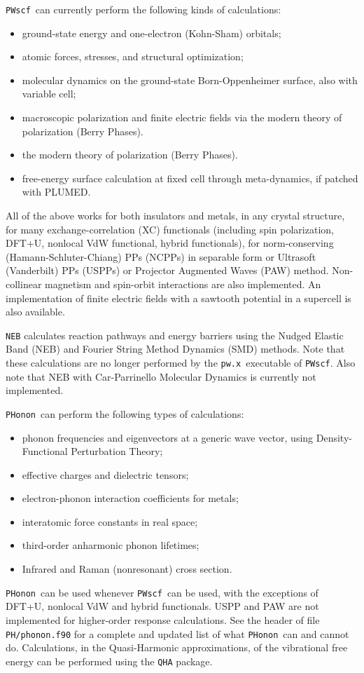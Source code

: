 \documentclass[12pt,a4paper]{article}
\def\pwx{\texttt{pw.x}}
\def\PWscf{\texttt{PWscf}}
\def\PHonon{\texttt{PHonon}}
\begin{document}
\PWscf\ can currently perform the following kinds of calculations:
\begin{itemize}
  \item ground-state energy and one-electron (Kohn-Sham) orbitals;
  \item atomic forces, stresses, and structural optimization;
  \item molecular dynamics on the ground-state Born-Oppenheimer surface,  also with variable cell;
  \item macroscopic polarization and finite electric fields via 
  the modern theory of polarization (Berry Phases).
  \item the modern theory of polarization (Berry Phases).
  \item free-energy surface calculation at fixed cell through meta-dynamics, if patched with PLUMED.
\end{itemize}
All of the above works for both insulators and metals, 
in any crystal structure, for many exchange-correlation (XC) functionals
(including spin polarization, DFT+U, nonlocal VdW functional,
hybrid functionals), for
norm-conserving (Hamann-Schluter-Chiang) PPs (NCPPs) in 
separable form or Ultrasoft (Vanderbilt) PPs (USPPs)
or Projector Augmented Waves (PAW) method.
Non-collinear magnetism and spin-orbit interactions 
are also implemented.  An implementation of finite electric 
fields with a sawtooth potential in a supercell is also available.

\texttt{NEB} calculates reaction pathways and energy barriers 
using the Nudged Elastic Band (NEB) and Fourier String Method Dynamics 
(SMD) methods. Note that these calculations are no longer performed
by the \pwx\ executable of \PWscf. Also note that NEB with Car-Parrinello
Molecular Dynamics is currently not implemented.

\PHonon\ can perform the following types of calculations:
\begin{itemize}
  \item phonon frequencies and eigenvectors at a generic wave vector,
  using Density-Functional Perturbation Theory;
  \item effective charges and dielectric tensors;
  \item electron-phonon interaction coefficients for metals;
  \item interatomic force constants in real space;
  \item third-order anharmonic phonon lifetimes;
  \item Infrared and Raman (nonresonant) cross section.
\end{itemize}
\PHonon\ can be used whenever \PWscf\ can be 
used, with the exceptions of DFT+U, nonlocal VdW and hybrid functionals. 
USPP and PAW are not implemented for higher-order response calculations.
See the header of file \texttt{PH/phonon.f90} for a complete and
updated list of what \PHonon\ can and cannot do.
Calculations, in the Quasi-Harmonic approximations, of the vibrational 
free energy can be performed using the \texttt{QHA}  package.
\end{document}
